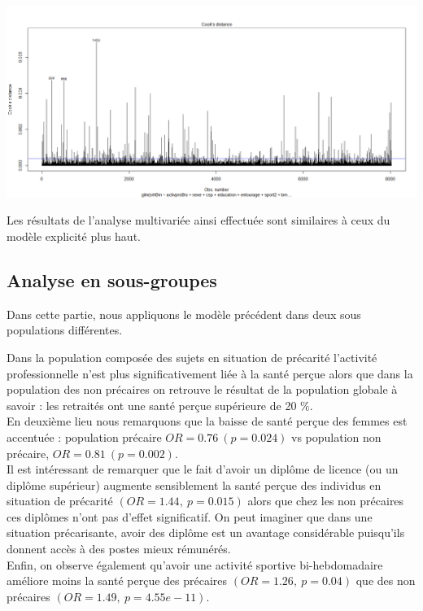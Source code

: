 \documentclass{book}
\begin{document}
\includegraphics[scale=.4]{cooks_distance.png}

\noindent
Les résultats de l'analyse multivariée ainsi effectuée sont similaires à ceux du modèle explicité plus haut.\\

\subsection{Analyse en sous-groupes}

\noindent
Dans cette partie, nous appliquons le modèle précédent dans deux sous populations différentes.\\

\bigskip

\noindent
Dans la population composée des sujets en situation de précarité l'activité professionnelle n'est plus significativement liée à la santé perçue alors que dans la population des non précaires on retrouve le résultat de la population globale à savoir : les retraités ont une santé perçue supérieure de 20 $\%$.\\
\noindent
En deuxième lieu nous remarquons que la baisse de santé perçue des femmes est accentuée : population précaire $OR = 0.76 ~ (p = 0.024)$ vs population non précaire, $OR = 0.81 ~ (p = 0.002)$.\\
\noindent
Il est intéressant de remarquer que le fait d'avoir un diplôme de licence (ou un diplôme supérieur) augmente sensiblement la santé perçue des individus en situation de précarité $(OR = 1.44, ~p = 0.015)$ alors que chez les non précaires ces diplômes n'ont pas d'effet significatif. On peut imaginer que dans une situation précarisante, avoir des diplôme est un avantage considérable puisqu'ils donnent accès à des postes mieux rémunérés.\\
\noindent
Enfin, on observe également qu'avoir une activité sportive bi-hebdomadaire améliore moins la santé perçue des précaires $(OR = 1.26, ~p = 0.04)$ que des non précaires $(OR = 1.49, ~p = 4.55e-11)$.\\
\end{document}
